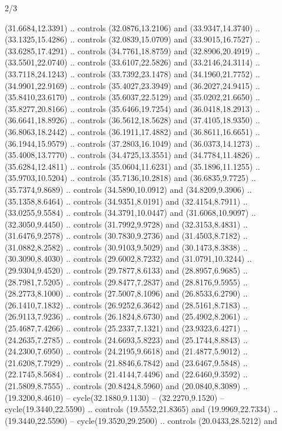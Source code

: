 \begin{flagdescription}{2/3}
\begin{scope}[yshift=\flagwidth,scale=\flagwidth/1241.93737]
\begin{scope}[y=-1mm, x=1mm,draw=gold,fill=blue,line join=miter,miter limit=4,line width=1.8\lw]
\begin{scope}[y=1mm, x=1mm, yscale=-1,shift={(573.68mm+\str,145.75)}]
\begin{scope}[scale=1.35,shift={(-9,-3)}]
\begin{scope}[scale=0.55]
\begin{scope}[scale=1.333]
    (31.6684,12.3391) .. controls (32.0876,13.2106) and (33.9347,14.3740) ..
    (33.1325,15.4286) .. controls (32.0839,15.0709) and (33.9015,16.7527) ..
    (33.6285,17.4291) .. controls (34.7761,18.8759) and (32.8906,20.4919) ..
    (33.5501,22.0740) .. controls (33.6107,22.5826) and (33.2146,24.3114) ..
    (33.7118,24.1243) .. controls (33.7392,23.1478) and (34.1960,21.7752) ..
    (34.9901,22.9169) .. controls (35.4027,23.3949) and (36.2027,24.9415) ..
    (35.8410,23.6170) .. controls (35.6037,22.5129) and (35.0202,21.6650) ..
    (35.8277,20.8166) .. controls (35.6466,19.7254) and (36.0418,18.2913) ..
    (36.6641,18.8926) .. controls (36.5612,18.5628) and (37.4105,18.9350) ..
    (36.8063,18.2442) .. controls (36.1911,17.4882) and (36.8611,16.6651) ..
    (36.1944,15.9579) .. controls (37.2803,16.1049) and (36.0373,14.1273) ..
    (35.4008,13.7770) .. controls (34.4725,13.3551) and (34.7784,11.4826) ..
    (35.6284,12.4811) .. controls (35.0604,11.6231) and (35.1896,11.1255) ..
    (35.9703,10.5204) .. controls (35.7136,10.2818) and (36.6835,9.7725) ..
    (35.7374,9.8689) .. controls (34.5890,10.0912) and (34.8209,9.3906) ..
    (35.1358,8.6464) .. controls (34.9351,8.0191) and (32.4154,8.7911) ..
    (33.0255,9.5584) .. controls (34.3791,10.0447) and (31.6068,10.9097) ..
    (32.3050,9.4450) .. controls (31.7992,9.9728) and (32.3153,8.4831) ..
    (31.6476,9.2578) .. controls (30.7830,9.2736) and (31.4503,8.7182) ..
    (31.0882,8.2582) .. controls (30.9103,9.5029) and (30.1473,8.3838) ..
    (30.3090,8.4030) .. controls (29.6002,8.7232) and (31.0791,10.3244) ..
    (29.9304,9.4520) .. controls (29.7877,8.6133) and (28.8957,6.9685) ..
    (28.7981,7.5205) .. controls (29.8477,7.2837) and (28.8176,9.5955) ..
    (28.2773,8.1000) .. controls (27.5007,8.1096) and (26.8533,6.2790) ..
    (26.1410,7.1832) .. controls (26.9252,6.3642) and (28.5161,8.7183) ..
    (26.9113,7.9236) .. controls (26.1824,8.6730) and (25.4902,8.2061) ..
    (25.4687,7.4266) .. controls (25.2337,7.1321) and (23.9323,6.4271) ..
    (24.2635,7.2785) .. controls (24.6693,5.8223) and (25.1744,8.8843) ..
    (24.2300,7.6950) .. controls (24.2195,9.6618) and (21.4877,5.9012) ..
    (21.6208,7.7929) .. controls (21.8846,6.7842) and (23.6467,9.5848) ..
    (22.1745,8.5684) .. controls (21.4144,7.4496) and (22.6460,9.3592) ..
    (21.5809,8.7555) .. controls (20.8424,8.5960) and (20.0840,8.3089) ..
    (19.3200,8.4610) -- cycle(32.1880,9.1130) -- (32.2270,9.1520) --
    cycle(19.3440,22.5590) .. controls (19.5552,21.8365) and (19.9969,22.7334) ..
    (19.3440,22.5590) -- cycle(19.3520,29.2500) .. controls (20.0433,28.5212) and

\end{scope}
\end{scope}
\end{scope}
\end{scope}
\end{scope}
\end{scope}
\end{flagdescription}

